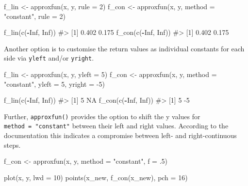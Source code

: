 \documentclass[
]{krantz}
\makeatletter
\newenvironment{Shaded}{\begin{snugshade}}{\end{snugshade}}
\newcommand{\CommentTok}[1]{\textcolor[rgb]{0.56,0.35,0.01}{\textit{#1}}}
\newcommand{\DataTypeTok}[1]{\textcolor[rgb]{0.13,0.29,0.53}{#1}}
\newcommand{\DecValTok}[1]{\textcolor[rgb]{0.00,0.00,0.81}{#1}}
\newcommand{\FloatTok}[1]{\textcolor[rgb]{0.00,0.00,0.81}{#1}}
\newcommand{\KeywordTok}[1]{\textcolor[rgb]{0.13,0.29,0.53}{\textbf{#1}}}
\newcommand{\NormalTok}[1]{#1}
\newcommand{\OperatorTok}[1]{\textcolor[rgb]{0.81,0.36,0.00}{\textbf{#1}}}
\newcommand{\OtherTok}[1]{\textcolor[rgb]{0.56,0.35,0.01}{#1}}
\newcommand{\StringTok}[1]{\textcolor[rgb]{0.31,0.60,0.02}{#1}}
\newenvironment{kframe}{%
\medskip{}
\setlength{\fboxsep}{.8em}
 \def\at@end@of@kframe{}%
 \ifinner\ifhmode%
  \def\at@end@of@kframe{\end{minipage}}%
  \begin{minipage}{\columnwidth}%
 \fi\fi%
 \def\FrameCommand##1{\hskip\@totalleftmargin \hskip-\fboxsep
 \colorbox{shadecolor}{##1}\hskip-\fboxsep
     \hskip-\linewidth \hskip-\@totalleftmargin \hskip\columnwidth}%
 \MakeFramed {\advance\hsize-\width
   \@totalleftmargin\z@ \linewidth\hsize
   \@setminipage}}%
 {\par\unskip\endMakeFramed%
 \at@end@of@kframe}
\renewenvironment{Shaded}{\begin{kframe}}{\end{kframe}}
\renewcommand{\KeywordTok} [1]{\textcolor[rgb]{0.00,0.44,0.13}{{#1}}}
\renewcommand{\DataTypeTok}[1]{\textcolor[rgb]{0.56,0.13,0.00}{{#1}}}
\renewcommand{\DecValTok}  [1]{\textcolor[rgb]{0.25,0.63,0.44}{{#1}}}
\renewcommand{\FloatTok}   [1]{\textcolor[rgb]{0.25,0.63,0.44}{{#1}}}
\renewcommand{\StringTok}  [1]{\textcolor[rgb]{0.25,0.44,0.63}{{#1}}}
\renewcommand{\CommentTok} [1]{\textcolor[rgb]{0.38,0.63,0.69}{{#1}}}
\renewcommand{\OtherTok}   [1]{\textcolor[rgb]{0.00,0.44,0.13}{{#1}}}
\renewcommand{\NormalTok}  [1]{{#1}}
\makeatother
\begin{document}
\begin{Shaded}
\begin{Highlighting}[]
\NormalTok{f_lin <-}\StringTok{ }\KeywordTok{approxfun}\NormalTok{(x, y, }\DataTypeTok{rule =} \DecValTok{2}\NormalTok{)}
\NormalTok{f_con <-}\StringTok{ }\KeywordTok{approxfun}\NormalTok{(x, y, }\DataTypeTok{method =} \StringTok{"constant"}\NormalTok{, }\DataTypeTok{rule =} \DecValTok{2}\NormalTok{)}

\KeywordTok{f_lin}\NormalTok{(}\KeywordTok{c}\NormalTok{(}\OperatorTok{-}\OtherTok{Inf}\NormalTok{, }\OtherTok{Inf}\NormalTok{))}
\CommentTok{#> [1] 0.402 0.175}
\KeywordTok{f_con}\NormalTok{(}\KeywordTok{c}\NormalTok{(}\OperatorTok{-}\OtherTok{Inf}\NormalTok{, }\OtherTok{Inf}\NormalTok{))}
\CommentTok{#> [1] 0.402 0.175}
\end{Highlighting}
\end{Shaded}

Another option is to customise the return values as individual constants for each side via \texttt{yleft} and/or \texttt{yright}.

\begin{Shaded}
\begin{Highlighting}[]
\NormalTok{f_lin <-}\StringTok{ }\KeywordTok{approxfun}\NormalTok{(x, y, }\DataTypeTok{yleft =} \DecValTok{5}\NormalTok{)}
\NormalTok{f_con <-}\StringTok{ }\KeywordTok{approxfun}\NormalTok{(x, y, }\DataTypeTok{method =} \StringTok{"constant"}\NormalTok{, }\DataTypeTok{yleft =} \DecValTok{5}\NormalTok{, }\DataTypeTok{yright =} \DecValTok{-5}\NormalTok{)}

\KeywordTok{f_lin}\NormalTok{(}\KeywordTok{c}\NormalTok{(}\OperatorTok{-}\OtherTok{Inf}\NormalTok{, }\OtherTok{Inf}\NormalTok{))}
\CommentTok{#> [1]  5 NA}
\KeywordTok{f_con}\NormalTok{(}\KeywordTok{c}\NormalTok{(}\OperatorTok{-}\OtherTok{Inf}\NormalTok{, }\OtherTok{Inf}\NormalTok{))}
\CommentTok{#> [1]  5 -5}
\end{Highlighting}
\end{Shaded}

Further, \texttt{approxfun()} provides the option to shift the y values for \texttt{method\ =\ "constant"} between their left and right values. According to the documentation this indicates a compromise between left- and right-continuous steps.

\begin{Shaded}
\begin{Highlighting}[]
\NormalTok{f_con <-}\StringTok{ }\KeywordTok{approxfun}\NormalTok{(x, y, }\DataTypeTok{method =} \StringTok{"constant"}\NormalTok{, }\DataTypeTok{f =} \FloatTok{.5}\NormalTok{)}

\KeywordTok{plot}\NormalTok{(x, y, }\DataTypeTok{lwd =} \DecValTok{10}\NormalTok{)}
\KeywordTok{points}\NormalTok{(x_new, }\KeywordTok{f_con}\NormalTok{(x_new), }\DataTypeTok{pch =} \DecValTok{16}\NormalTok{)}
\end{Highlighting}
\end{Shaded}
\end{document}
